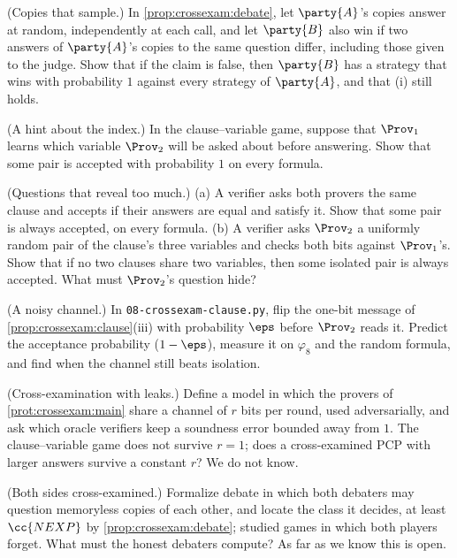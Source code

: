 \begin{refsection}
\begin{exercises}
\item \variation\hard (Copies that sample.) In \cref{prop:crossexam:debate}, let $\party{A}$'s copies answer at random, independently at each call, and let $\party{B}$ also win if two answers of $\party{A}$'s copies to the same question differ, including those given to the judge. Show that if the claim is false, then $\party{B}$ has a strategy that wins with probability $1$ against every strategy of $\party{A}$, and that (i) still holds. \label{ex:crossexam:sampling}

\item \attack (A hint about the index.) In the clause--variable game, suppose that $\Prov_1$ learns which variable $\Prov_2$ will be asked about before answering. Show that some pair is accepted with probability $1$ on every formula.\label{ex:crossexam:index}

\item \attack (Questions that reveal too much.) (a) A verifier asks both provers the same clause and accepts if their answers are equal and satisfy it. Show that some pair is always accepted, on every formula. (b) A verifier asks $\Prov_2$ a uniformly random pair of the clause's three variables and checks both bits against $\Prov_1$'s. Show that if no two clauses share two variables, then some isolated pair is always accepted. What must $\Prov_2$'s question hide?\label{ex:crossexam:reveal}

\item \simulation (A noisy channel.) In \texttt{08-\allowbreak crossexam-\allowbreak clause.py}, flip the one-bit message of \cref{prop:crossexam:clause}(iii) with probability $\eps$ before $\Prov_2$ reads it. Predict the acceptance probability ($1-\eps$), measure it on $\varphi_8$ and the random formula, and find when the channel still beats isolation.\label{ex:crossexam:channels}

\item \research (Cross-examination with leaks.) Define a model in which the provers of \cref{prot:crossexam:main} share a channel of $r$ bits per round, used adversarially, and ask which oracle verifiers keep a soundness error bounded away from $1$. The clause--variable game does not survive $r=1$; does a cross-examined PCP with larger answers survive a constant $r$? We do not know.\label{ex:crossexam:leaks}

\item \research (Both sides cross-examined.) Formalize debate in which both debaters may question memoryless copies of each other, and locate the class it decides, at least $\cc{NEXP}$ by \cref{prop:crossexam:debate}; \textcite{FeigenbaumKollerShor1995} studied games in which both players forget. What must the honest debaters compute? As far as we know this is open.\label{ex:crossexam:both}
\end{exercises}


\end{refsection}
